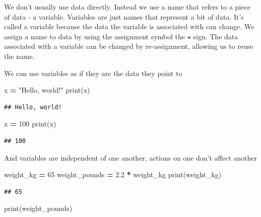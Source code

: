 \documentclass[]{book}
\newenvironment{Shaded}{\begin{snugshade}}{\end{snugshade}}
\newcommand{\BuiltInTok}[1]{#1}
\newcommand{\DecValTok}[1]{\textcolor[rgb]{0.00,0.00,0.81}{#1}}
\newcommand{\FloatTok}[1]{\textcolor[rgb]{0.00,0.00,0.81}{#1}}
\newcommand{\NormalTok}[1]{#1}
\newcommand{\OperatorTok}[1]{\textcolor[rgb]{0.81,0.36,0.00}{\textbf{#1}}}
\newcommand{\StringTok}[1]{\textcolor[rgb]{0.31,0.60,0.02}{#1}}
\theoremstyle{definition}
\theoremstyle{definition}
\theoremstyle{definition}
\theoremstyle{remark}
\begin{document}
We don't usually use data directly. Instead we use a name that refers to
a piece of data - a variable. Variables are just names that represent a
bit of data. It's called a variable because the data the variable is
associated with can change. We assign a name to data by using the
assignment symbol the \texttt{=} sign. The data associated with a
variable can be changed by re-assignment, allowing us to reuse the name.

We can use variables as if they are the data they point to

\begin{Shaded}
\begin{Highlighting}[]
\NormalTok{x }\OperatorTok{=} \StringTok{"Hello, world!"}
\BuiltInTok{print}\NormalTok{(x)}
\end{Highlighting}
\end{Shaded}

\begin{verbatim}
## Hello, world!
\end{verbatim}

\begin{Shaded}
\begin{Highlighting}[]
\NormalTok{x }\OperatorTok{=} \DecValTok{100}
\BuiltInTok{print}\NormalTok{(x)}
\end{Highlighting}
\end{Shaded}

\begin{verbatim}
## 100
\end{verbatim}

And variables are independent of one another, actions on one don't
affect another

\begin{Shaded}
\begin{Highlighting}[]
\NormalTok{weight_kg }\OperatorTok{=} \DecValTok{65}
\NormalTok{weight_pounds }\OperatorTok{=} \FloatTok{2.2} \OperatorTok{*}\NormalTok{ weight_kg}
\BuiltInTok{print}\NormalTok{(weight_kg)}
\end{Highlighting}
\end{Shaded}

\begin{verbatim}
## 65
\end{verbatim}

\begin{Shaded}
\begin{Highlighting}[]
\BuiltInTok{print}\NormalTok{(weight_pounds)}
\end{Highlighting}
\end{Shaded}
\end{document}
